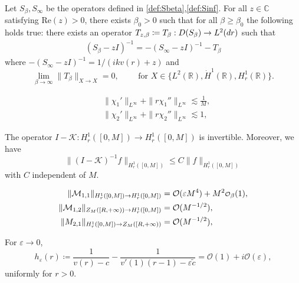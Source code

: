 \documentclass[10pt,a4paper]{amsart}
\def\RR {\mathbb{R}}
\def\dd{{\rm d}}
\def\eps{\varepsilon}
\newcommand\smallO{
  \mathchoice
    {{\scriptstyle\mathcal{O}}}%
    {{\scriptstyle\mathcal{O}}}%
    {{\scriptscriptstyle\mathcal{O}}}%
    {\scalebox{.7}{$\scriptscriptstyle\mathcal{O}$}}%
  }
\newcommand{\cK}{\mathcal{K}}
\newcommand{\cM}{\mathcal{M}}
\newcommand{\cO}{\mathcal{O}}
\begin{document}
\begin{proposition}
\label{prop:conv_Sbeta}
Let $S_\beta,S_\infty$ be the operators defined in \cref{def:Sbeta},\cref{def:Sinf}. For all $z\in \mathbb{C}$ satisfying $\mathrm{Re}(z)>0$, there exists $\beta_0>0$ such that for all $\beta\geq \beta_0$ the following holds true: there exists an operator $T_{z,\beta} \coloneqq T_\beta :D(S_\beta) \to L^2(\dd r)$ such that
\begin{align}
\label{eq:splitS_beta}
    (S_\beta-zI)^{-1}=-(S_\infty-zI)^{-1}-T_\beta
\end{align}
 where $-(S_\infty-zI)^{-1}=1/(ikv(r)+z)$ and
\begin{equation}
\lim_{\beta \rightarrow \infty} \|T_{\beta} \|_{X \to X} = 0, \qquad \text{ for } X\in \{L^2(\RR),\dot{H}^1(\RR),H^1_r(\RR)\}.
\end{equation}
\end{proposition}

\begin{align}
&\|\chi_1'\|_{L^\infty}+\|r\chi_1''\|_{L^\infty}\lesssim \frac{1}{M},\label{eq:boundschi1}\\
&\|\chi_2'\|_{L^\infty}+\|r\chi_2''\|_{L^\infty}\lesssim 1,\label{eq:boundschi2}
\end{align}

 \begin{lemma}
 \label{lemma:I-K}
     The operator $I-\cK:H^{1}_r([0,M])\to H^1_r([0,M])$ is invertible. Moreover, we have 
     \begin{equation}
     \|(I-\cK)^{-1}f\|_{H^1_r([0,M])}\leq C\|f\|_{H^1_r([0,M])}     \end{equation} with $C$ independent of $M$.
 \end{lemma}

\begin{align}
\label{bd:M11}\| \cM_{1,1}\|_{H^1_r([0,M]) \rightarrow H^1_r([0,M])} & = \mathcal O(\varepsilon M^4)+M^2\smallO_\beta(1), \\
\| \cM_{1,2}\|_{Z_M([R, +\infty)) \rightarrow H^1_r([0,M])}& = \cO(M^{-1/2}),\\
\|\mathcal \cM_{2,1}\|_{H^1_r
([0,M]) \rightarrow Z_M([R,+\infty))} & = \cO(M^{-1/2}),
\end{align}

\begin{lemma}
\label{lemma:approximation_denominator}
For $\eps \rightarrow 0$,
\begin{equation}
h_\eps(r) \coloneqq \frac{1}{v(r)-c}- \frac{1}{v'(1)(r-1)-\eps \tilde{c}} = \mathcal{O}(1) + i \mathcal{O}(\eps),
\end{equation}
uniformly for $r>0$.
\end{lemma}
\end{document}
